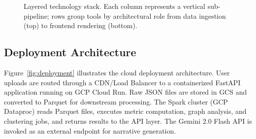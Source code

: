\documentclass[conference]{IEEEtran}
\begin{document}
\begin{figure}[t]
\caption{Layered technology stack. Each column represents a vertical sub-pipeline; rows group tools by architectural role from data ingestion (top) to frontend rendering (bottom).}
\label{fig:techstack}
\end{figure}

\subsection{Deployment Architecture}

Figure~\ref{fig:deployment} illustrates the cloud deployment architecture. User uploads are routed through a CDN/Load Balancer to a containerized FastAPI application running on GCP Cloud Run. Raw JSON files are stored in GCS and converted to Parquet for downstream processing. The Spark cluster (GCP Dataproc) reads Parquet files, executes metric computation, graph analysis, and clustering jobs, and returns results to the API layer. The Gemini 2.0 Flash API is invoked as an external endpoint for narrative generation.
\end{document}
